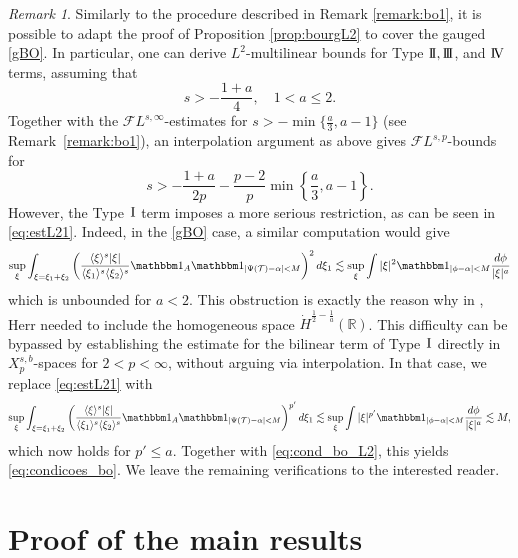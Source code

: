 \documentclass[a4paper,
11pt,  reqno]{amsart}
\newcommand{\I}{\hspace{0.2mm}\textup{I}\hspace{0.2mm}}
\newcommand{\II}{\textup{I \hspace{-2.9mm} I} }
\newcommand{\III}{\textup{I \hspace{-2.9mm} I \hspace{-2.9mm} I}}
\newcommand{\IV}{\textup{I \hspace{-2.9mm} V}}
\newcommand{\5}{\textup{V}}
\newcommand{\FL}{\mathcal{F} L}
\newcommand{\ind}{\mathbbm 1}
\newcommand{\les}{\lesssim}
\theoremstyle{remark}
\newtheorem{remark}[theorem]{Remark}
\newcommand{\R}{\mathbb{R}}
\newcommand{\TT}{\mathcal{T}}
\newcommand{\al}{\alpha}
\newcommand{\jb}[1]
{\langle #1 \rangle}
\numberwithin{equation}{section}
\numberwithin{theorem}{section}
\begin{document}
\begin{remark}
    \label{remark:bo2}
    Similarly to the procedure described in Remark \ref{remark:bo1}, it is possible to adapt the proof of Proposition \ref{prop:bourgL2} to cover the gauged \eqref{gBO}. In particular, one can derive $L^2$-multilinear bounds for Type $\II, \III$, and $\IV$ terms, assuming that
    $$
    s>-\frac{1+a}{4}, \quad  1<a\le 2.
    $$
    Together with the $\FL^{s,\infty}$-estimates
    for $s>-\min\{\frac a3, a-1\}$ (see Remark~\ref{remark:bo1}),
    an interpolation argument as above gives $\FL^{s,p}$-bounds for
\begin{equation}\label{eq:cond_bo_L2}
        s>-\frac{1+a}{2p} - \frac{p-2}{p}\min\left\{\frac{a}3, a-1\right\}.
\end{equation}
However, the Type $\I$ term imposes a more serious restriction, as can be seen in \eqref{eq:estL21}. Indeed, in the \eqref{gBO} case, a similar computation would give
\begin{align}
\sup_\xi \int_{\xi=\xi_1+\xi_2} \left(\frac{\jb{\xi}^{s} |\xi| }{\jb{\xi_1}^{s}\jb{\xi_2}^{s}}
    \ind_A \ind_{|\Psi(\TT) - \al| < M } \right)^{2} d\xi_1
    \les \sup_\xi \int |\xi|^2 \ind_{|\phi - \al| < M } \frac{d\phi}{|\xi|^a }
\end{align}
    which is unbounded for $a<2$. This obstruction is exactly the reason why in \cite{herr_bo}, Herr
    needed to include the homogeneous space $\dot H^{\frac12 - \frac1a}(\R)$.
    This difficulty can be bypassed by establishing the estimate for the bilinear term of Type $\I$ directly in $X^{s, b}_p$-spaces for $2<p<\infty$, without arguing via interpolation. In that case, we replace \eqref{eq:estL21} with
    \begin{align}
    \sup_\xi \int_{\xi=\xi_1+\xi_2} \left(\frac{\jb{\xi}^{s} |\xi| }{\jb{\xi_1}^{s}\jb{\xi_2}^{s}}
    \ind_A \ind_{|\Psi(\TT) - \al| < M } \right)^{p'} d\xi_1
    \les \sup_\xi \int |\xi|^{p'} \ind_{|\phi - \al| < M } \frac{d\phi}{|\xi|^a } \lesssim M,
\end{align}
which now holds for $p'\le a$. Together with \eqref{eq:cond_bo_L2}, this yields \eqref{eq:condicoes_bo}. We leave the remaining verifications to the interested reader.
\end{remark}





\section{Proof of the main results}\label{sec:lwp}
\end{document}
